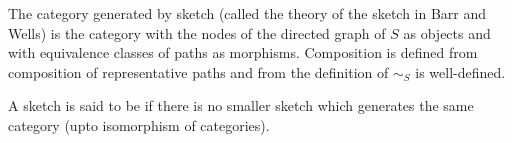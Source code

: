 The category generated by sketch (called the theory of the sketch in Barr and Wells) is the category with
the nodes of the directed graph of $S$ as objects and with equivalence classes of paths as morphisms.
Composition is defined from composition of representative paths and from the definition of $\sim_S$ is well-defined.

A sketch is said to be  
if there is no smaller sketch which generates the same category (upto isomorphism of categories).

